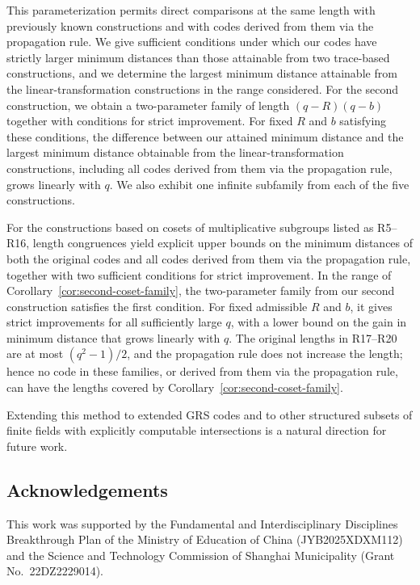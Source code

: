 \documentclass[preprint,12pt,a4paper]{elsarticle}
\begin{document}
This parameterization permits direct comparisons at the same length with previously known constructions and with codes derived from them via the propagation rule. We give sufficient conditions under which our codes have strictly larger minimum distances than those attainable from two trace-based constructions, and we determine the largest minimum distance attainable from the linear-transformation constructions in the range considered. For the second construction, we obtain a two-parameter family of length $(q-R)(q-b)$ together with conditions for strict improvement. For fixed $R$ and $b$ satisfying these conditions, the difference between our attained minimum distance and the largest minimum distance obtainable from the linear-transformation constructions, including all codes derived from them via the propagation rule, grows linearly with $q$. We also exhibit one infinite subfamily from each of the five constructions.

For the constructions based on cosets of multiplicative subgroups listed as R5--R16, length congruences yield explicit upper bounds on the minimum distances of both the original codes and all codes derived from them via the propagation rule, together with two sufficient conditions for strict improvement. In the range of Corollary~\ref{cor:second-coset-family}, the two-parameter family from our second construction satisfies the first condition. For fixed admissible $R$ and $b$, it gives strict improvements for all sufficiently large $q$, with a lower bound on the gain in minimum distance that grows linearly with $q$. The original lengths in R17--R20 are at most $(q^2-1)/2$, and the propagation rule does not increase the length; hence no code in these families, or derived from them via the propagation rule, can have the lengths covered by Corollary~\ref{cor:second-coset-family}.

Extending this method to extended GRS codes and to other structured subsets of finite fields with explicitly computable intersections is a natural direction for future work.

\begin{samepage}
\section*{Acknowledgements}
This work was supported by the Fundamental and Interdisciplinary Disciplines Breakthrough Plan of the Ministry of Education of China (JYB2025XDXM112) and the Science and Technology Commission of Shanghai Municipality (Grant No.~22DZ2229014).

\end{samepage}
\end{document}
